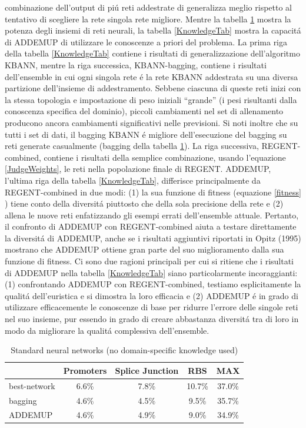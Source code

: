 \documentclass[a4paper,10pt]{article}
\begin{document}
combinazione dell'output di pi\'u reti addestrate di generalizza meglio rispetto al tentativo di scegliere la rete singola rete migliore. Mentre la tabella \ref{NoKnowledgeTab} mostra la potenza degli insiemi di reti neurali, la tabella \ref{KnowledgeTab} mostra la capacit\'a di ADDEMUP di utilizzare le conoscenze a priori del problema. La prima riga della tabella \ref{KnowledgeTab} contiene i risultati di generalizzazione dell'algoritmo KBANN, mentre la riga successica, KBANN-bagging, contiene i risultati dell'ensemble in cui ogni singola rete \'e la rete KBANN addestrata su una diversa partizione dell'insieme di  addestramento. Sebbene ciascuna di queste reti inizi con la stessa topologia e impostazione di peso iniziali ``grande'' (i pesi risultanti dalla conoscenza specifica del dominio), piccoli cambiamenti nel set di allenamento producono ancora cambiamenti significativi nelle previsioni. Si noti inoltre che su tutti i set di dati, il bagging KBANN \'e migliore dell'esecuzione del bagging su reti generate casualmente (bagging della tabella \ref{NoKnowledgeTab}). La riga successiva, REGENT-combined, contiene i risultati della semplice combinazione, usando l'equazione \ref{JudgeWeights}, le reti nella popolazione finale di REGENT. ADDEMUP, l'ultima riga della tabella \ref{KnowledgeTab}, differisce principalmente da REGENT-combined in due modi: (1) la sua funzione di fitness (equazione \ref{fitness} ) tiene conto della diversit\'a piuttosto che della sola precisione della rete e (2) allena le nuove reti enfatizzando gli esempi errati dell'ensemble attuale. Pertanto, il confronto di ADDEMUP con REGENT-combined aiuta a testare direttamente la diversit\'a di ADDEMUP, anche se i risultati aggiuntivi riportati in Opitz (1995) mostrano che ADDEMUP ottiene gran parte del suo miglioramento dalla sua funzione di fitness. Ci sono due ragioni principali per cui si ritiene che i risultati di ADDEMUP nella tabella \ref{KnowledgeTab} siano particolarmente incoraggianti: (1) confrontando ADDEMUP con REGENT-combined, testiamo esplicitamente la qualit\'a dell'euristica e si dimostra la loro efficacia e (2) ADDEMUP \'e in grado di utilizzare efficacemente le conoscenze di base per ridurre l'errore delle singole reti nel suo insieme, pur essendo in grado di creare abbastanza diversit\'a tra di loro in modo da migliorare la qualit\'a complessiva dell'ensemble. 
  
  \begin{table}[h]\caption{Standard neural networks (no domain-specific knowledge used)} \label{NoKnowledgeTab}
   \centering
   \begin{tabular}[h]{|l|c|c|c|c|}
    \hline
    & Promoters & Splice Junction & RBS & MAX \\ \hline
   best-network & 6.6\% & 7.8\% & 10.7\% & 37.0\% \\ 
   bagging & 4.6\% & 4.5\% & 9.5\% & 35.7\% \\
   ADDEMUP & 4.6\% & 4.9\% & 9.0\% & 34.9\% \\ \hline
   \end{tabular}
  \end{table}
  
\end{document}
